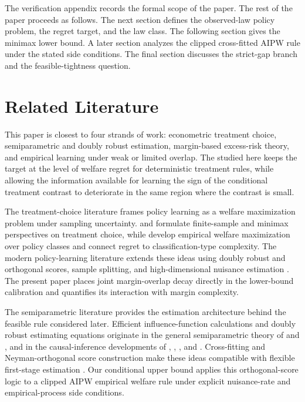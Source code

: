 \documentclass[11pt]{article}
\begin{document}
The verification appendix records the formal scope of the paper.  The rest of the paper proceeds as follows.  The next section defines the observed-law policy problem, the regret target, and the law class.  The following section gives the minimax lower bound.  A later section analyzes the clipped cross-fitted AIPW rule under the stated side conditions.  The final section discusses the strict-gap branch and the feasible-tightness question.


\section{Related Literature}

This paper is closest to four strands of work: econometric treatment choice, semiparametric and doubly robust estimation, margin-based excess-risk theory, and empirical learning under weak or limited overlap.  The  studied here keeps the target at the level of welfare regret for deterministic treatment rules, while allowing the information available for learning the sign of the conditional treatment contrast to deteriorate in the same region where the contrast is small.

The treatment-choice literature frames policy learning as a welfare maximization problem under sampling uncertainty.  \citet{Manski2004,Manski2009} and \citet{Stoye2009} formulate finite-sample and minimax perspectives on treatment choice, while \citet{Kitagawa2018} develop empirical welfare maximization over policy classes and connect regret to classification-type complexity.  The modern policy-learning literature extends these ideas using doubly robust and orthogonal scores, sample splitting, and high-dimensional nuisance estimation \citep{Athey2021,Chernozhukov2018,Chernozhukov2022}.  The present paper places joint margin-overlap decay directly in the lower-bound calibration and quantifies its interaction with margin complexity.

The semiparametric literature provides the estimation architecture behind the feasible rule considered later.  Efficient influence-function calculations and doubly robust estimating equations originate in the general semiparametric theory of \citet{Bickel1993} and \citet{Newey1994}, and in the causal-inference developments of \citet{Robins1994}, \citet{Hahn1998}, \citet{Hirano2003}, and \citet{VanDerLaan2011}.  Cross-fitting and Neyman-orthogonal score construction make these ideas compatible with flexible first-stage estimation \citep{Chernozhukov2018,Chernozhukov2022}.  Our conditional upper bound applies this orthogonal-score logic to a clipped AIPW empirical welfare rule under explicit nuisance-rate and empirical-process side conditions.
\end{document}
